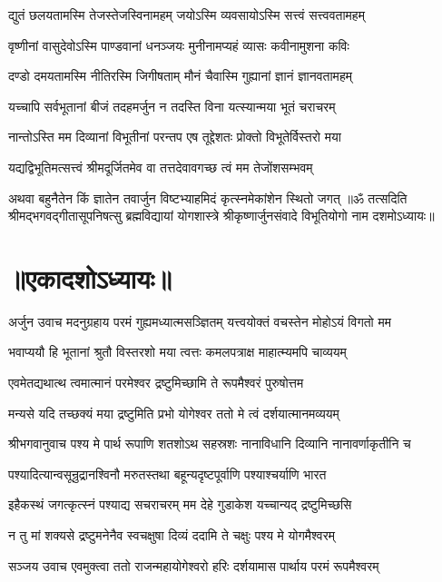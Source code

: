 \twolineshloka
{द्युतं छलयतामस्मि तेजस्तेजस्विनामहम्}
{जयोऽस्मि व्यवसायोऽस्मि सत्त्वं सत्त्ववतामहम्}%

\twolineshloka
{वृष्णीनां वासुदेवोऽस्मि पाण्डवानां धनञ्जयः}
{मुनीनामप्यहं व्यासः कवीनामुशना कविः}%

\twolineshloka
{दण्डो दमयतामस्मि नीतिरस्मि जिगीषताम्}
{मौनं चैवास्मि गुह्यानां ज्ञानं ज्ञानवतामहम्}%

\twolineshloka
{यच्चापि सर्वभूतानां बीजं तदहमर्जुन}
{न तदस्ति विना यत्स्यान्मया भूतं चराचरम्}%

\twolineshloka
{नान्तोऽस्ति मम दिव्यानां विभूतीनां परन्तप}
{एष तूद्देशतः प्रोक्तो विभूतेर्विस्तरो मया}%

\twolineshloka
{यद्यद्विभूतिमत्सत्त्वं श्रीमदूर्जितमेव वा}
{तत्तदेवावगच्छ त्वं मम तेजोंशसम्भवम्}%

\twolineshloka
{अथवा बहुनैतेन किं ज्ञातेन तवार्जुन}
{विष्टभ्याहमिदं कृत्स्नमेकांशेन स्थितो जगत्}%
{॥ॐ तत्सदिति श्रीमद्भगवद्गीतासूपनिषत्सु ब्रह्मविद्यायां योगशास्त्रे श्रीकृष्णार्जुनसंवादे विभूतियोगो नाम दशमोऽध्यायः॥}

\section{॥एकादशोऽध्यायः॥}
{अर्जुन उवाच}
\twolineshloka
{मदनुग्रहाय परमं गुह्यमध्यात्मसञ्ज्ञितम्}
{यत्त्वयोक्तं वचस्तेन मोहोऽयं विगतो मम}%

\twolineshloka
{भवाप्ययौ हि भूतानां श्रुतौ विस्तरशो मया}
{त्वत्तः कमलपत्राक्ष माहात्म्यमपि चाव्ययम्}%

\twolineshloka
{एवमेतद्यथात्थ त्वमात्मानं परमेश्वर}
{द्रष्टुमिच्छामि ते रूपमैश्वरं पुरुषोत्तम}%

\twolineshloka
{मन्यसे यदि तच्छक्यं मया द्रष्टुमिति प्रभो}
{योगेश्वर ततो मे त्वं दर्शयात्मानमव्ययम्}%

{श्रीभगवानुवाच}
\twolineshloka
{पश्य मे पार्थ रूपाणि शतशोऽथ सहस्रशः}
{नानाविधानि दिव्यानि नानावर्णाकृतीनि च}%

\twolineshloka
{पश्यादित्यान्वसून्रुद्रानश्विनौ मरुतस्तथा}
{बहून्यदृष्टपूर्वाणि पश्याश्चर्याणि भारत}%

\twolineshloka
{इहैकस्थं जगत्कृत्स्नं पश्याद्य सचराचरम्}
{मम देहे गुडाकेश यच्चान्यद् द्रष्टुमिच्छसि}%

\twolineshloka
{न तु मां शक्यसे द्रष्टुमनेनैव स्वचक्षुषा}
{दिव्यं ददामि ते चक्षुः पश्य मे योगमैश्वरम्}%

{सञ्जय उवाच}
\twolineshloka
{एवमुक्त्वा ततो राजन्महायोगेश्वरो हरिः}
{दर्शयामास पार्थाय परमं रूपमैश्वरम्}%

